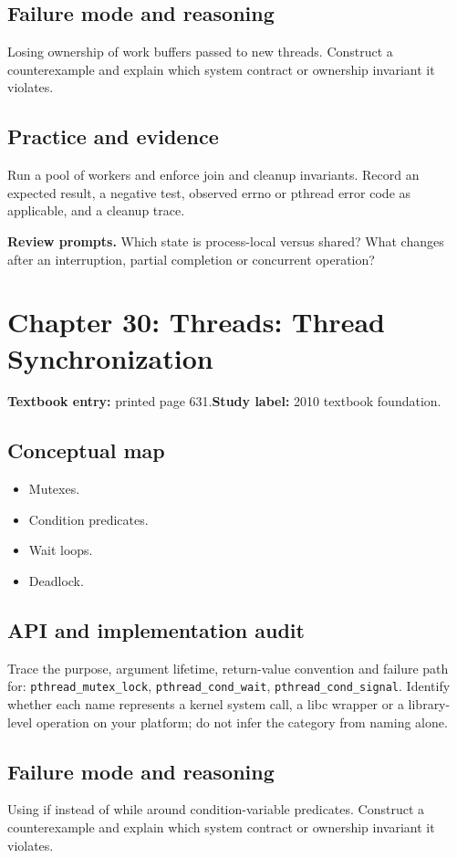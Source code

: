 \documentclass[11pt,letterpaper,oneside]{report}
\begin{document}
\subsection{Failure mode and reasoning}
Losing ownership of work buffers passed to new threads. Construct a counterexample and explain which system contract or ownership invariant it violates.

\subsection{Practice and evidence}
Run a pool of workers and enforce join and cleanup invariants. Record an expected result, a negative test, observed errno or pthread error code as applicable, and a cleanup trace.

\textbf{Review prompts.} Which state is process-local versus shared? What changes after an interruption, partial completion or concurrent operation?

\section{Chapter 30: Threads: Thread Synchronization}
\textbf{Textbook entry:} printed page 631.\quad \textbf{Study label:} 2010 textbook foundation.

\subsection{Conceptual map}
\begin{itemize}
\item Mutexes.
\item Condition predicates.
\item Wait loops.
\item Deadlock.
\end{itemize}
\subsection{API and implementation audit}
Trace the purpose, argument lifetime, return-value convention and failure path for: \nolinkurl{pthread_mutex_lock}, \nolinkurl{pthread_cond_wait}, \nolinkurl{pthread_cond_signal}. Identify whether each name represents a kernel system call, a libc wrapper or a library-level operation on your platform; do not infer the category from naming alone.

\subsection{Failure mode and reasoning}
Using if instead of while around condition-variable predicates. Construct a counterexample and explain which system contract or ownership invariant it violates.
\end{document}
